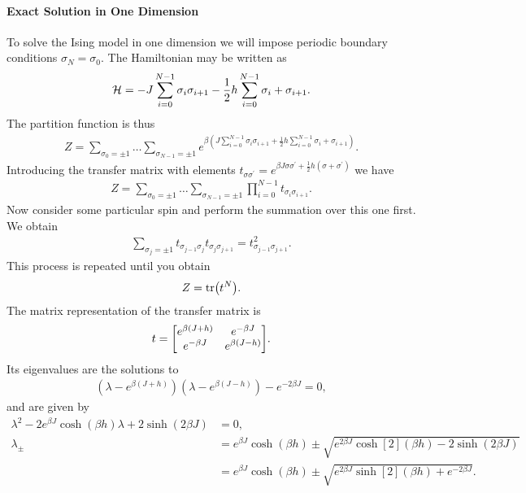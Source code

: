 \paragraph{Exact Solution in One Dimension}
To solve the Ising model in one dimension we will impose periodic boundary conditions $\sigma_{N} = \sigma_{0}$. The Hamiltonian may be written as
\begin{align*}
	\mathcal{H} = -J\sum\limits_{i = 0}^{N - 1}\sigma_{i}\sigma_{i + 1} - \frac{1}{2}h\sum\limits_{i = 0}^{N - 1}\sigma_{i} + \sigma_{i + 1}.
\end{align*}
The partition function is thus
\begin{align*}
	Z = \sum\limits_{\sigma_{0} = \pm 1}\dots \sum\limits_{\sigma_{N - 1} = \pm 1}e^{\beta\left(J\sum\limits_{i = 0}^{N - 1}\sigma_{i}\sigma_{i + 1} + \frac{1}{2}h\sum\limits_{i = 0}^{N - 1}\sigma_{i} + \sigma_{i + 1}\right)}.
\end{align*}
Introducing the transfer matrix with elements $t_{\sigma\sigma^{\prime}} = e^{\beta J\sigma\sigma^{\prime} + \frac{1}{2}h(\sigma + \sigma^{\prime})}$ we have
\begin{align*}
	Z = \sum\limits_{\sigma_{0} = \pm 1}\dots \sum\limits_{\sigma_{N - 1} = \pm 1}\prod\limits_{i = 0}^{N - 1}t_{\sigma_{i}\sigma_{i + 1}}.
\end{align*}
Now consider some particular spin and perform the summation over this one first. We obtain
\begin{align*}
	\sum\limits_{\sigma_{j} = \pm 1}t_{\sigma_{j - 1}\sigma_{j}}t_{\sigma_{j}\sigma_{j + 1}} = t_{\sigma_{j - 1}\sigma_{j + 1}}^{2}.
\end{align*}
This process is repeated until you obtain
\begin{align*}
	Z = \tr(t^{N}).
\end{align*}
The matrix representation of the transfer matrix is
\begin{align*}
	t =
	\mqty[
		e^{\beta(J + h)}  & e^{-\beta J} \\
		e^{-\beta J} & e^{\beta(J - h)}
	].
\end{align*}
Its eigenvalues are the solutions to
\begin{align*}
	\left(\lambda - e^{\beta(J + h)}\right)\left(\lambda - e^{\beta(J - h)}\right) - e^{-2\beta J} = 0,
\end{align*}
and are given by
\begin{align*}
	\lambda^{2} - 2e^{\beta J}\cosh(\beta h)\lambda + 2\sinh(2\beta J) &= 0, \\
	\lambda_{\pm}                                                      &= e^{\beta J}\cosh(\beta h) \pm \sqrt{e^{2\beta J}\cosh[2](\beta h) - 2\sinh(2\beta J)} \\
	                                                                   &= e^{\beta J}\cosh(\beta h) \pm \sqrt{e^{2\beta J}\sinh[2](\beta h) + e^{-2\beta J}}.	
\end{align*}


